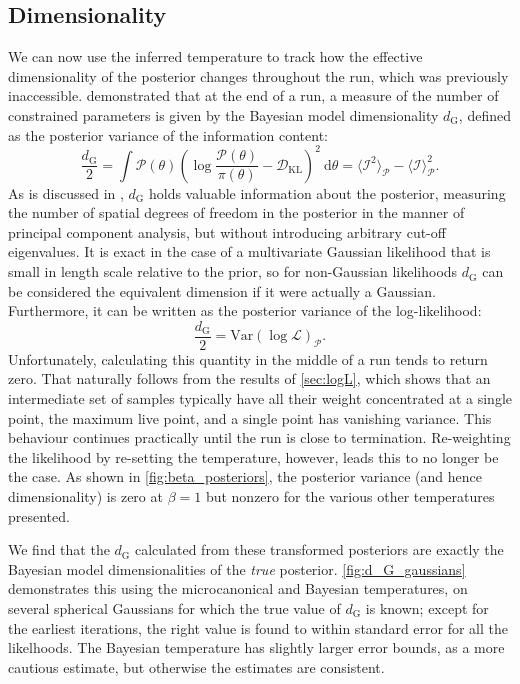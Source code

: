 \documentclass[usenatbib]{mnras}
\newcommand{\Like}{\mathcal{L}}
\newcommand{\DKL}{\mathcal{D}_\mathrm{KL}}
\newcommand{\dG}{d_\mathrm{G}}
\begin{document}
\subsection{Dimensionality}\label{sec:dimensionality}
We can now use the inferred temperature to track how the effective dimensionality of the posterior changes throughout the run, which was previously inaccessible. \citet{Handley_2019} demonstrated that at the end of a run, a measure of the number of constrained parameters is given by the Bayesian model dimensionality $\dG$, defined as the posterior variance of the information content:
\begin{equation}\label{eq:d_G}
    \frac{\dG}{2} = \int \mathcal{P}(\theta) \left(\log \frac{\mathcal{P}(\theta)}{\pi(\theta)} - \DKL\right)^2 \: \mathrm{d}\theta
    = \langle \mathcal{I}^2 \rangle_\mathcal{P} - \langle \mathcal{I} \rangle^2_\mathcal{P}.
\end{equation}
As is discussed in \citet{Handley_2019}, $\dG$ holds valuable information about the posterior, measuring the number of spatial degrees of freedom in the posterior in the manner of principal component analysis, but without introducing arbitrary cut-off eigenvalues. It is exact in the case of a multivariate Gaussian likelihood that is small in length scale relative to the prior, so for non-Gaussian likelihoods $\dG$ can be considered the equivalent dimension if it were actually a Gaussian. Furthermore, it can be written as the posterior variance of the log-likelihood:
\begin{equation}
    \frac{\dG}{2} = \mathrm{Var}(\log\Like)_\mathcal{P}.
\end{equation}
Unfortunately, calculating this quantity in the middle of a run tends to return zero. That naturally follows from the results of \cref{sec:logL}, which shows that an intermediate set of samples typically have all their weight concentrated at a single point, the maximum live point, and a single point has vanishing variance. This behaviour continues practically until the run is close to termination. Re-weighting the likelihood by re-setting the temperature, however, leads this to no longer be the case. As shown in \cref{fig:beta_posteriors}, the posterior variance (and hence dimensionality) is zero at $\beta = 1$ but nonzero for the various other temperatures presented. 
\par
We find that the $\dG$ calculated from these transformed posteriors are exactly the Bayesian model dimensionalities of the \textit{true} posterior. \cref{fig:d_G_gaussians} demonstrates this using the microcanonical and Bayesian temperatures, on several spherical Gaussians for which the true value of $\dG$ is known; except for the earliest iterations, the right value is found to within standard error for all the likelhoods. The Bayesian temperature has slightly larger error bounds, as a more cautious estimate, but otherwise the estimates are consistent. 
\end{document}
